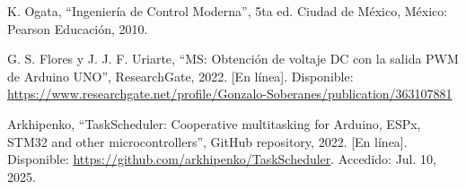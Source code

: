 
\begin{thebibliography}{00}
 K. Ogata, ``Ingeniería de Control Moderna'', 5ta ed. Ciudad de México, México: Pearson Educación, 2010.

 G. S. Flores y J. J. F. Uriarte, ``MS: Obtención de voltaje DC con la salida PWM de Arduino UNO'', ResearchGate, 2022. [En línea]. Disponible: \href{https://www.researchgate.net/profile/Gonzalo-Soberanes/publication/363107881_Obtencion_de_voltaje_DC_con_la_salida_PWM_de_Arduino_UNO/links/630e20fd61e4553b954e136f/Obtencion-de-voltaje-DC-con-la-salida-PWM-de-Arduino-UNO.pdf}{https://www.researchgate.net/profile/Gonzalo-Soberanes/publication/363107881}

 Arkhipenko, ``TaskScheduler: Cooperative multitasking for Arduino, ESPx, STM32 and other microcontrollers'', GitHub repository, 2022. [En línea]. Disponible: \href{https://github.com/arkhipenko/TaskScheduler}{https://github.com/arkhipenko/TaskScheduler}. Accedido: Jul. 10, 2025.

\end{thebibliography}
\vspace{12pt}